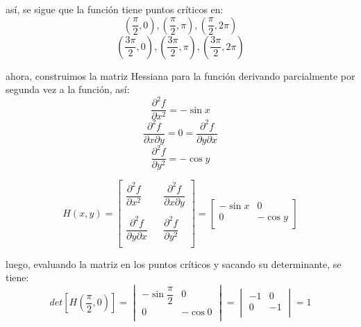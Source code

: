 \documentclass[a4paper,12pt]{article}
\begin{document}
		así, se sigue que la función tiene puntos críticos en:
			$$(\frac{\pi}{2}, 0), (\frac{\pi}{2}, \pi), (\frac{\pi}{2}, 2\pi)$$
			$$(\frac{3\pi}{2}, 0), (\frac{3\pi}{2}, \pi), (\frac{3\pi}{2}, 2\pi)$$

		ahora, construimos la matriz Hessiana para la función derivando
		parcialmente por segunda vez a la función, así:
			$$ \frac{\partial^2f}{\partial x^2} = -\sin x$$
			$$ \frac{\partial^2f}{\partial x\partial y} = 0 = \frac{\partial^2f}{\partial y\partial x}$$
			$$ \frac{\partial^2f}{\partial y^2} = - \cos y$$

			$$H(x,y) = \begin{bmatrix}
    					\dfrac{\partial^2f}{\partial x^2} & & \dfrac{\partial^2f}{\partial x\partial y} \\
    					& & \\
    					\dfrac{\partial^2f}{\partial y\partial x}&  & \dfrac{\partial^2f}{\partial y^2} \\
						\end{bmatrix} =
						\begin{bmatrix}
			    			-\sin x & 0 \\
			    			0  & - \cos y \\
						\end{bmatrix}
						$$

		luego, evaluando la matriz en los puntos críticos y sacando su determinante,
		se tiene:
		$$det[H(\frac{\pi}{2}, 0)] =
			\begin{vmatrix}
				-\sin \dfrac{\pi}{2} & 0 \\
				0  & - \cos 0 \\
			\end{vmatrix} =
			\begin{vmatrix}
				-1 & 0 \\
				 0 & -1 \\
			\end{vmatrix} = 1$$
\end{document}
